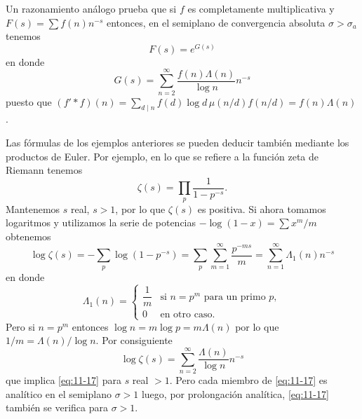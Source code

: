 \documentclass[12pt,a4paper]{book}
\begin{document}
    \begin{ejemplo}
        Un razonamiento análogo prueba que si $f$ es completamente multiplicativa y
        $F(s)=\sum f(n)n^{-s}$ entonces, en el semiplano de convergencia absoluta
        $\sigma>\sigma_{a}$ tenemos
        \begin{equation*}
            F(s)=e^{G(s)}
        \end{equation*}
        en donde
        \begin{equation*}
            G(s)=\sum_{n=2}^{\infty}\frac{f(n)\Lambda(n)}{\log n}n^{-s}
        \end{equation*}
        puesto que $(f'*f)(n)=\sum_{d\mid n}f(d)\log d\,\mu(n/d)f(n/d)=f(n)\Lambda(n)$.
    \end{ejemplo}

    Las fórmulas de los ejemplos anteriores se pueden deducir también mediante los productos
    de Euler. Por ejemplo, en lo que se refiere a la función zeta de Riemann tenemos
    \begin{equation*}
        \zeta(s)=\prod_{p}\frac{1}{1-p^{-s}}.
    \end{equation*}
    Mantenemos $s$ real, $s>1$, por lo que $\zeta(s)$ es positiva. Si ahora tomamos
    logaritmos y utilizamos la serie de potencias $-\log(1-x)=\sum x^{m}/m$ obtenemos
    \begin{equation*}
        \log\zeta(s)=-\sum_{p}\log(1-p^{-s})=\sum_{p}\sum_{m=1}^{\infty}\frac{p^{-ms}}{m}=\sum_{n=1}^{\infty}\Lambda_{1}(n)n^{-s}
    \end{equation*}
    en donde
    \begin{equation*}
        \Lambda_{1}(n)=
        \begin{cases}
            \dfrac{1}{m}&\text{si }n=p^{m}\text{ para un primo }p,\\[1.5ex]
            0&\text{en otro caso.}
        \end{cases}
    \end{equation*}
    Pero si $n=p^{m}$ entonces $\log n=m\log p=m\Lambda(n)$ por lo que
    $1/m=\Lambda(n)/\log n$. Por consiguiente
    \begin{equation*}
        \log\zeta(s)=\sum_{n=2}^{\infty}\frac{\Lambda(n)}{\log n}n^{-s}
    \end{equation*}
    que implica \eqref{eq:11-17} para $s$ real $>1$. Pero cada miembro de \eqref{eq:11-17} es
    analítico en el semiplano $\sigma>1$ luego, por prolongación analítica,
    \eqref{eq:11-17} también se verifica para $\sigma>1$.
\end{document}
